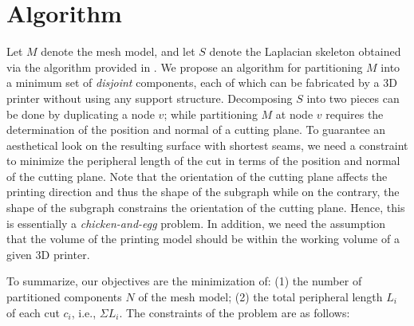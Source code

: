 \section{Algorithm}
Let $M$ denote the mesh model, and let $S$ denote the Laplacian skeleton obtained via the algorithm provided in \cite{AuTCCL08}. We propose an algorithm for partitioning $M$ into a minimum set of \emph{disjoint} components, each of which can be fabricated by a 3D printer without using any support structure. Decomposing $S$ into two pieces can be done by duplicating a node $v$; while partitioning $M$ at node $v$ requires the determination of the position and normal of a cutting plane. To guarantee an aesthetical look on the resulting surface with shortest seams, we need a constraint to minimize the peripheral length of the cut in terms of the position and normal of the cutting plane. Note that the orientation of the cutting plane affects the printing direction and thus the shape of the subgraph while on the contrary, the shape of the subgraph constrains the orientation of the cutting plane. Hence, this is essentially a \emph{chicken-and-egg} problem. {In addition, we need the assumption that the volume of the printing model should be within the working volume of a given 3{D} printer.}

To summarize, our objectives are the minimization of: (1) the number of partitioned components $N$ of the mesh model; (2) the total peripheral length $L_i$ of each cut $c_i$, i.e., $\Sigma L_i$. The constraints of the problem are as follows:

